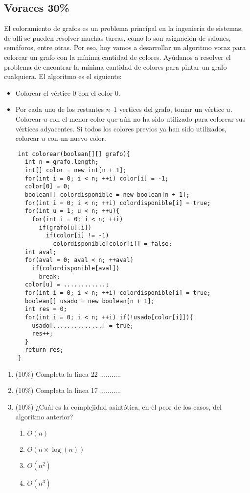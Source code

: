 \documentclass[9.5 pt]{article}
\begin{document}
\begin{multicols}{2}
	\section{Voraces 30\%}
	El coloramiento de grafos es un problema principal en la ingeniería de sistemas, de allí se pueden resolver muchas tareas, como lo son asignación de salones, semáforos, entre otras. Por eso, hoy vamos a desarrollar un algoritmo voraz para colorear un grafo con la mínima cantidad de colores. Ayúdanos a resolver el problema de encontrar la mínima cantidad de colores para pintar un grafo cualquiera. El algoritmo es el siguiente:
	\begin{itemize}[noitemsep]
		\item Colorear el vértice $0$ con el color $0$.
		\item Por cada uno de los restantes $n – 1$ vertices del grafo, tomar un vértice $u$. Colorear $u$ con el menor color que aún no ha sido utilizado para colorear sus vértices adyacentes. Si todos los colores previos ya han sido utilizados, colorear $u$ con un nuevo color.
	\end{itemize}
	\begin{lstlisting}
	int colorear(boolean[][] grafo){
	  int n = grafo.length;
	  int[] color = new int[n + 1];
	  for(int i = 0; i < n; ++i) color[i] = -1;
	  color[0] = 0;
	  boolean[] colordisponible = new boolean[n + 1];
	  for(int i = 0; i < n; ++i) colordisponible[i] = true;
	  for(int u = 1; u < n; ++u){
	    for(int i = 0; i < n; ++i)
	      if(grafo[u][i])
	        if(color[i] != -1)
	          colordisponible[color[i]] = false;
	  int aval;
	  for(aval = 0; aval < n; ++aval)
	    if(colordisponible[aval])
	      break;
	  color[u] = ............;
	  for(int i = 0; i < n; ++i) colordisponible[i] = true;
	  boolean[] usado = new boolean[n + 1];
	  int res = 0;
	  for(int i = 0; i < n; ++i) if(!usado[color[i]]){
	    usado[..............] = true;
	    res++;
	  }
	  return res;
	}
	\end{lstlisting}
	\begin{enumerate}[label=\alph*)]
		\item (10\%) Completa la línea 22 ...........
		\item (10\%) Completa la línea 17 ...........
		\item (10\%) ¿Cuál es la complejidad asintótica, en el peor de los casos, del algoritmo anterior?
		\begin{enumerate}[label=\roman*)]
			\item $O(n)$
			\item $O(n \times \log(n))$
			\item $O(n^2)$
			\item $O(n^3)$
		\end{enumerate}
	\end{enumerate}



\end{multicols}
\end{document}
